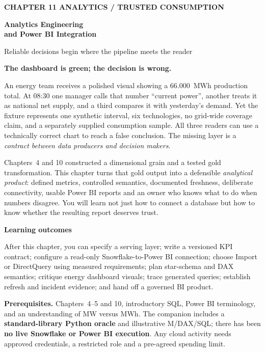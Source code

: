 \documentclass[11pt,twoside]{article}
\begin{document}
{\sffamily\bfseries\fontsize{9}{11}\selectfont\color{steelblue} CHAPTER 11 \hfill ANALYTICS / TRUSTED CONSUMPTION}\par\vspace{3mm}
{\sffamily\bfseries\fontsize{20.2}{23.4}\selectfont\color{navy} Analytics Engineering\\and Power BI Integration}\par\vspace{2mm}
{\sffamily\fontsize{11.1}{14}\selectfont\color{steelblue} Reliable decisions begin where the pipeline meets the reader}\par\vspace{3mm}
\begin{insight}\textbf{The dashboard is green; the decision is wrong.}\par
An energy team receives a polished visual showing a 66.000~MWh production total. At 08:30 one manager calls that number ``current power'', another treats it as national net supply, and a third compares it with yesterday's demand. Yet the fixture represents one synthetic interval, six technologies, no grid-wide coverage claim, and a separately supplied consumption sample. All three readers can use a technically correct chart to reach a false conclusion. The missing layer is a \emph{contract between data producers and decision makers}.
\end{insight}
Chapters~4 and 10 constructed a dimensional grain and a tested gold transformation. This chapter turns that gold output into a defensible \emph{analytical product}: defined metrics, controlled semantics, documented freshness, deliberate connectivity, usable Power BI reports and an owner who knows what to do when numbers disagree. You will learn not just how to connect a database but how to know whether the resulting report deserves trust.
\begin{whitebox}\textbf{Learning outcomes}\par
After this chapter, you can specify a serving layer; write a versioned KPI contract; configure a read-only Snowflake-to-Power BI connection; choose Import or DirectQuery using measured requirements; plan star-schema and DAX semantics; critique energy dashboard visuals; trace generated queries; establish refresh and incident evidence; and hand off a governed BI product.\end{whitebox}
\textbf{Prerequisites.} Chapters~4--5 and 10, introductory SQL, Power BI terminology, and an understanding of MW versus MWh. The companion includes a \textbf{standard-library Python oracle} and illustrative M/DAX/SQL; there has been \textbf{no live Snowflake or Power BI execution}. Any cloud activity needs approved credentials, a restricted role and a pre-agreed spending limit.
\end{document}
